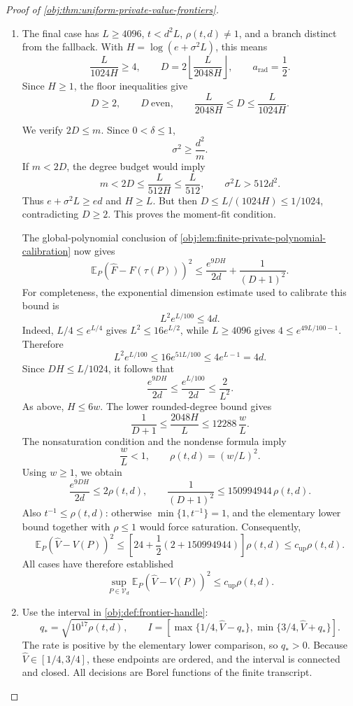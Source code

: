 \documentclass[11pt]{article}
\begin{document}
\begin{proof}[Proof of \cref{obj:thm:uniform-private-value-frontiers}]
\begin{enumerate}
\item
The final case has \(L\ge4096\), \(t<d^2L\), \(\rho(t,d)\ne1\), and a branch distinct from the fallback. With \(H=\log(e+\sigma^2L)\), this means
\[
\frac{L}{1024H}\ge4,
\qquad
D=2\left\lfloor\frac{L}{2048H}\right\rfloor,
\qquad a_{\mathrm{rad}}=\frac12.
\]
Since \(H\ge1\), the floor inequalities give
\[
D\ge2,\qquad D\ \text{even},\qquad
\frac{L}{2048H}\le D\le\frac{L}{1024H}.
\]

We verify \(2D\le m\). Since \(0<\delta\le1\),
\[
\sigma^2\ge\frac{d^2}{m}.
\]
If \(m<2D\), the degree budget would imply
\[
m<2D\le\frac{L}{512H}\le\frac{L}{512},
\qquad
\sigma^2L>512d^2.
\]
Thus \(e+\sigma^2L\ge ed\) and \(H\ge L\). But then
\(D\le L/(1024H)\le1/1024\), contradicting \(D\ge2\).
This proves the moment-fit condition.

The global-polynomial conclusion of
\cref{obj:lem:finite-private-polynomial-calibration} now gives
\[
\mathbb E_P(\widehat F-F(\tau(P)))^2
\le\frac{e^{9DH}}{2d}+\frac1{(D+1)^2}.
\]
For completeness, the exponential dimension estimate used to calibrate this bound is
\[
L^2e^{L/100}\le4d.
\]
Indeed, \(L/4\le e^{L/4}\) gives \(L^2\le16e^{L/2}\), while
\(L\ge4096\) gives \(4\le e^{49L/100-1}\). Therefore
\[
L^2e^{L/100}
\le16e^{51L/100}
\le4e^{L-1}=4d.
\]
Since \(DH\le L/1024\), it follows that
\[
\frac{e^{9DH}}{2d}
\le\frac{e^{L/100}}{2d}\le\frac2{L^2}.
\]
As above, \(H\le6w\). The lower rounded-degree bound gives
\[
\frac1{D+1}\le\frac{2048H}{L}
\le12288\,\frac wL.
\]
The nonsaturation condition and the nondense formula imply
\[
\frac wL<1,\qquad \rho(t,d)=(w/L)^2.
\]
Using \(w\ge1\), we obtain
\[
\frac{e^{9DH}}{2d}\le2\rho(t,d),
\qquad
\frac1{(D+1)^2}\le150994944\,\rho(t,d).
\]
Also \(t^{-1}\le\rho(t,d)\): otherwise
\(\min\{1,t^{-1}\}=1\), and the elementary lower bound together with
\(\rho\le1\) would force saturation. Consequently,
\[
\mathbb E_P(\widehat V-V(P))^2
\le\left[24+\frac12(2+150994944)\right]\rho(t,d)
\le c_{\mathrm{up}}\rho(t,d).
\]
All cases have therefore established
\[
\sup_{P\in\mathcal V_d}
\mathbb E_P(\widehat V-V(P))^2
\le c_{\mathrm{up}}\rho(t,d).
\]

\item
Use the interval in \cref{obj:def:frontier-handle}:
\[
q_*=\sqrt{10^{17}\rho(t,d)},
\qquad
I=
\left[
\max\{1/4,\widehat V-q_*\},
\min\{3/4,\widehat V+q_*\}
\right].
\]
The rate is positive by the elementary lower comparison, so \(q_*>0\).
Because \(\widehat V\in[1/4,3/4]\), these endpoints are ordered, and the interval is connected and closed. All decisions are Borel functions of the finite transcript.


\end{enumerate}
\end{proof}
\end{document}
